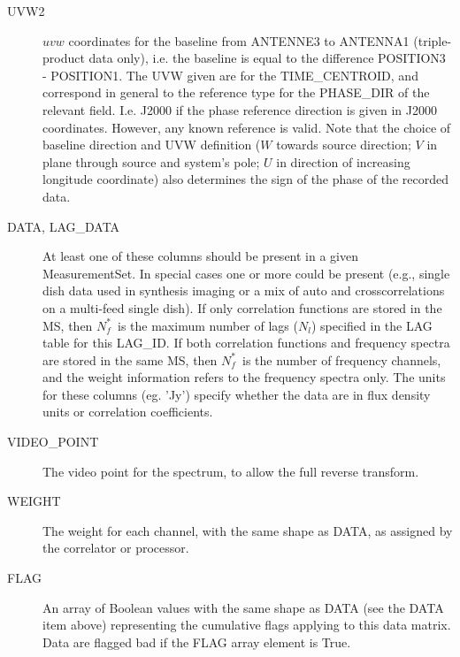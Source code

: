 \documentclass{article}
\newcommand{\nfs}{$N_f^*$}
\newcommand{\nl}{$N_l$}
\begin{document}
\begin{description}
\item[UVW2] $uvw$ coordinates for the baseline from ANTENNE3 to ANTENNA1
   (triple-product data only), i.e. the
   baseline is equal to the difference POSITION3 - POSITION1. The UVW given
   are for the TIME\_CENTROID, and correspond in general to the reference type
   for the PHASE\_DIR of the relevant field. I.e. J2000 if the phase reference
   direction is given in J2000 coordinates. However, any known reference is
   valid.
   Note that the choice of baseline direction and UVW definition ($W$ towards
   source direction; $V$ in plane through source and system's pole; $U$ in
   direction of increasing longitude coordinate) also determines the sign of
   the phase of the recorded data.

\item[DATA,  LAG\_DATA] At least one of these columns
should be present in a given MeasurementSet. In special cases one or
more could be present (e.g., single dish data used in synthesis
imaging or a mix of auto and crosscorrelations on a multi-feed single
dish). If only correlation functions are stored in the MS, then \nfs\
is the maximum number of lags (\nl) specified in the LAG table for
this LAG\_ID.  If both correlation functions and frequency spectra are
stored in the same MS, then \nfs\ is the number of frequency channels,
and the weight information refers to the frequency spectra only. The
units for these columns (eg. 'Jy') specify whether the data are in
flux density units or correlation coefficients.

\item[VIDEO\_POINT] The video point for the spectrum, to allow the
full reverse transform.



\item[WEIGHT] The weight for each channel, with the same shape as DATA,
 as assigned by the correlator or processor. 

\item[FLAG] An array of Boolean values with the same shape as DATA
(see the DATA item above) representing the cumulative flags applying
to this data matrix. Data are flagged
bad if the FLAG array element is True.


\end{description}
\end{document}
